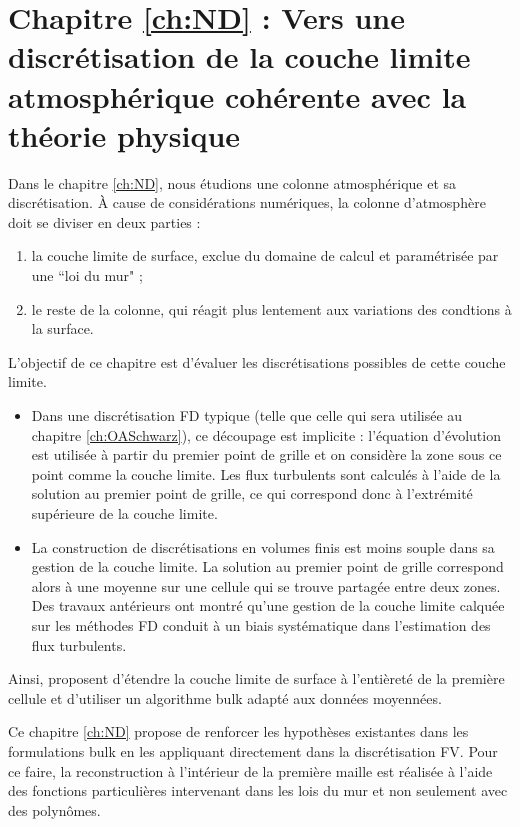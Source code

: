 \section*{Chapitre \ref{ch:ND} : Vers une discrétisation de la couche limite atmosphérique cohérente avec la théorie physique}
Dans le chapitre \ref{ch:ND}, nous étudions une colonne atmosphérique et sa discrétisation.
À cause de considérations numériques, la colonne
d'atmosphère doit se diviser en deux parties :
\begin{enumerate}
	\item
	la couche limite de surface, exclue du domaine
	de calcul et paramétrisée par une ``loi du mur" ;
	\item
	le reste de la colonne, qui réagit plus lentement
	aux variations des condtions à la surface.
\end{enumerate}
L'objectif de ce chapitre est d'évaluer les discrétisations possibles
de cette couche limite.
\begin{itemize}
	\item
Dans une discrétisation FD typique (telle que celle qui sera
utilisée au chapitre \ref{ch:OASchwarz}), ce découpage est implicite :
l'équation d'évolution est utilisée à partir
du premier point de grille et on considère la zone
sous ce point comme la couche limite.
Les flux turbulents sont calculés à l'aide de la solution
	au premier point de grille, ce qui correspond donc à
	l'extrémité supérieure de la couche limite.
\item La construction de discrétisations en volumes finis
	est moins souple dans sa gestion de la couche limite.
	La solution au premier point de grille correspond
	alors à une moyenne sur une cellule qui se trouve
	partagée entre deux zones.
	Des travaux antérieurs ont montré qu'une gestion
	de la couche limite calquée sur les méthodes FD
	conduit à un biais systématique dans l'estimation
	des flux turbulents.
\end{itemize}
Ainsi, \citep{nishizawa_surface_2018} proposent
d'étendre la couche limite de surface à l'entièreté de
la première cellule et d'utiliser un algorithme bulk
adapté aux données moyennées.
\par
Ce chapitre \ref{ch:ND} propose de renforcer les hypothèses
	existantes dans les formulations bulk en les
	appliquant directement dans la discrétisation FV.
	Pour ce faire, la reconstruction à l'intérieur
	de la première maille est réalisée à l'aide des fonctions
	particulières intervenant dans les lois du mur et
	non seulement avec des polynômes.
\par
